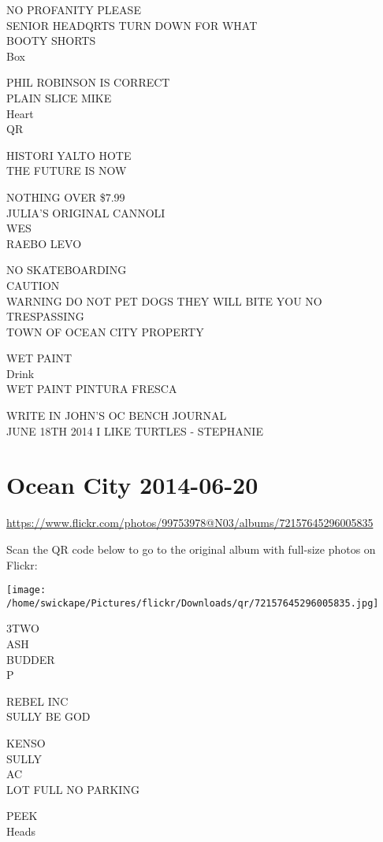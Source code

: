 \documentclass[10pt,letterpaper]{article}
\begin{document}
NO PROFANITY PLEASE\\
SENIOR HEADQRTS TURN DOWN FOR WHAT\\
BOOTY SHORTS\\
Box

PHIL ROBINSON IS CORRECT\\
PLAIN SLICE MIKE\\
Heart\\
QR

HISTORI YALTO HOTE\\
THE FUTURE IS NOW

NOTHING OVER \$7.99\\
JULIA'S ORIGINAL CANNOLI\\
WES\\
RAEBO LEVO

NO SKATEBOARDING\\
CAUTION\\
WARNING DO NOT PET DOGS THEY WILL BITE YOU NO TRESPASSING\\
TOWN OF OCEAN CITY PROPERTY

WET PAINT\\
Drink\\
WET PAINT PINTURA FRESCA

WRITE IN JOHN'S OC BENCH JOURNAL\\
JUNE 18TH 2014 I LIKE TURTLES {-} STEPHANIE
\pagebreak

\section*{Ocean City 2014-06-20}

\url{https://www.flickr.com/photos/99753978@N03/albums/72157645296005835}

Scan the QR code below to go to the original album with full-size photos on Flickr:

\texttt{[image: /home/swickape/Pictures/flickr/Downloads/qr/72157645296005835.jpg]}
\pagebreak

3TWO\\
ASH\\
BUDDER\\
P

REBEL INC\\
SULLY BE GOD

KENSO\\
SULLY\\
AC\\
LOT FULL NO PARKING

PEEK\\
Heads
\end{document}
